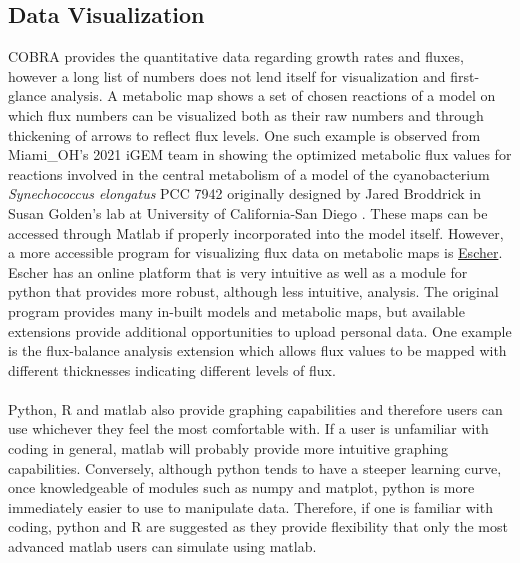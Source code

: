 \subsection{Data Visualization}
COBRA provides the quantitative data regarding growth rates and fluxes, however a long list of numbers does not lend itself for visualization and first-glance analysis. A metabolic map shows a set of chosen reactions of a model on which flux numbers can be visualized both as their raw numbers and through thickening of arrows to reflect flux levels. One such example is observed from Miami\_OH’s 2021 iGEM team in showing the optimized metabolic flux values for reactions involved in the central metabolism of a model of the cyanobacterium \textit{Synechococcus elongatus} PCC 7942 originally designed by Jared Broddrick in Susan Golden’s lab at University of California-San Diego \parencite{Broddrick2016}. These maps can be accessed through Matlab if properly incorporated into the model itself. However, a more accessible program for visualizing flux data on metabolic maps is \href{https://escher.github.io/}{Escher}. Escher has an online platform that is very intuitive as well as a module for python that provides more robust, although less intuitive, analysis. The original program provides many in-built models and metabolic maps, but available extensions provide additional opportunities to upload personal data. One example is the flux-balance analysis extension which allows flux values to be mapped with different thicknesses indicating different levels of flux. \\ \\
Python, R and matlab also provide graphing capabilities and therefore users can use whichever they feel the most comfortable with. If a user is unfamiliar with coding in general, matlab will probably provide more intuitive graphing capabilities. Conversely, although python tends to have a steeper learning curve, once knowledgeable of modules such as numpy and matplot, python is more immediately easier to use to manipulate data. Therefore, if one is familiar with coding, python and R are suggested as they provide flexibility that only the most advanced matlab users can simulate using matlab.

